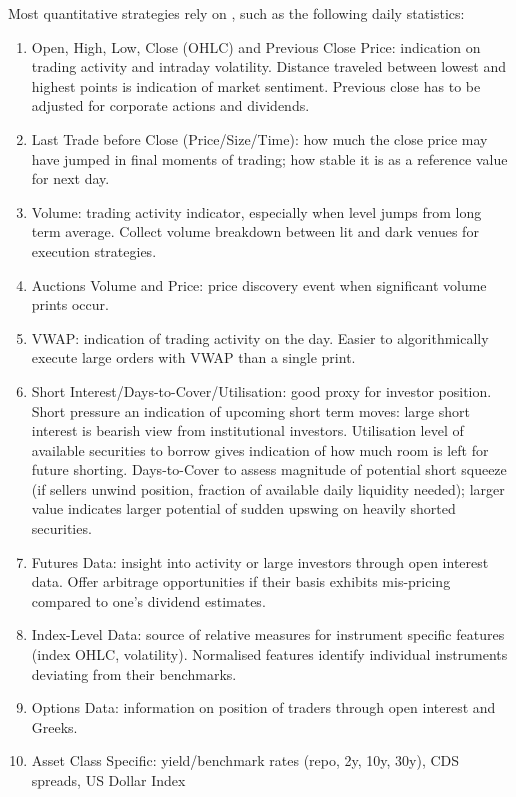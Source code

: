 Most quantitative strategies rely on , such as the following daily statistics:
\begin{enumerate}[label=\roman*.]
\setlength{\itemsep}{0pt}
\item Open, High, Low, Close (OHLC) and Previous Close Price: indication on trading activity and intraday volatility. Distance traveled between lowest and highest points is indication of market sentiment. Previous close has to be adjusted for corporate actions and dividends.
\item Last Trade before Close (Price/Size/Time): how much the close price may have jumped in final moments of trading; how stable it is as a reference value for next day.
\item Volume: trading activity indicator, especially when level jumps from long term average. Collect volume breakdown between lit and dark venues for execution strategies.
\item Auctions Volume and Price: price discovery event when significant volume prints occur.
\item VWAP: indication of trading activity on the day. Easier to algorithmically execute large orders with VWAP than a single print.
\item Short Interest/Days-to-Cover/Utilisation: good proxy for investor position. Short pressure an indication of upcoming short term moves: large short interest is bearish view from institutional investors. Utilisation level of available securities to borrow gives indication of how much room is left for future shorting. Days-to-Cover to assess magnitude of potential short squeeze (if sellers unwind position, fraction of available daily liquidity needed); larger value indicates larger potential of sudden upswing on heavily shorted securities.
\item Futures Data: insight into activity or large investors through open interest data. Offer arbitrage opportunities if their basis exhibits mis-pricing compared to one's dividend estimates.
\item Index-Level Data: source of relative measures for instrument specific features (index OHLC, volatility). Normalised features identify individual instruments deviating from their benchmarks.
\item Options Data: information on position of traders through open interest and Greeks.
\item Asset Class Specific: yield/benchmark rates (repo, 2y, 10y, 30y), CDS spreads, US Dollar Index
\end{enumerate}
